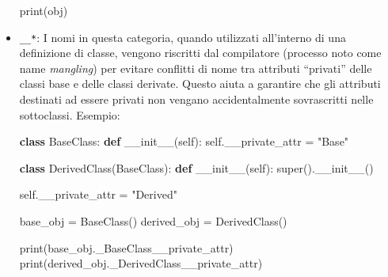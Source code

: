 \documentclass[
  letterpaper,
]{scrbook}
\newenvironment{Shaded}{\begin{snugshade}}{\end{snugshade}}
\newcommand{\BuiltInTok}[1]{\textcolor[rgb]{0.00,0.23,0.31}{#1}}
\newcommand{\FunctionTok}[1]{\textcolor[rgb]{0.28,0.35,0.67}{#1}}
\newcommand{\KeywordTok}[1]{\textcolor[rgb]{0.00,0.23,0.31}{\textbf{#1}}}
\newcommand{\NormalTok}[1]{\textcolor[rgb]{0.00,0.23,0.31}{#1}}
\newcommand{\OperatorTok}[1]{\textcolor[rgb]{0.37,0.37,0.37}{#1}}
\newcommand{\StringTok}[1]{\textcolor[rgb]{0.13,0.47,0.30}{#1}}
\newcommand{\VariableTok}[1]{\textcolor[rgb]{0.07,0.07,0.07}{#1}}
\providecommand{\tightlist}{%
  \setlength{\itemsep}{0pt}\setlength{\parskip}{0pt}}\usepackage{longtable,booktabs,array}
\newcommand*\circled[1]{\tikz[baseline=(char.base)]{
          \node[shape=circle,draw,inner sep=1pt] (char) {{\scriptsize#1}};}}
\begin{document}
\begin{itemize}
\begin{Shaded}
\begin{Highlighting}[]
\BuiltInTok{print}\NormalTok{(obj) }\hspace*{\fill}\NormalTok{\circled{3}}
\end{Highlighting}
\end{Shaded}

\item
  \texttt{\_\_*}: I nomi in questa categoria, quando utilizzati
  all'interno di una definizione di classe, vengono riscritti dal
  compilatore (processo noto come name \emph{mangling}) per evitare
  conflitti di nome tra attributi ``privati'' delle classi base e delle
  classi derivate. Questo aiuta a garantire che gli attributi destinati
  ad essere privati non vengano accidentalmente sovrascritti nelle
  sottoclassi. Esempio:

\label{annotated-cell-169}%
\begin{Shaded}
\begin{Highlighting}[]
\KeywordTok{class}\NormalTok{ BaseClass:}
  \KeywordTok{def} \FunctionTok{\_\_init\_\_}\NormalTok{(}\VariableTok{self}\NormalTok{):}
    \VariableTok{self}\NormalTok{.\_\_private\_attr }\OperatorTok{=} \StringTok{"Base"}

\KeywordTok{class}\NormalTok{ DerivedClass(BaseClass):}
  \KeywordTok{def} \FunctionTok{\_\_init\_\_}\NormalTok{(}\VariableTok{self}\NormalTok{):}
    \BuiltInTok{super}\NormalTok{().}\FunctionTok{\_\_init\_\_}\NormalTok{()}

    \VariableTok{self}\NormalTok{.\_\_private\_attr }\OperatorTok{=} \StringTok{"Derived"}

\NormalTok{base\_obj }\OperatorTok{=}\NormalTok{ BaseClass()}
\NormalTok{derived\_obj }\OperatorTok{=}\NormalTok{ DerivedClass()}

\BuiltInTok{print}\NormalTok{(base\_obj.\_BaseClass\_\_private\_attr) }\hspace*{\fill}\NormalTok{\circled{1}}
\BuiltInTok{print}\NormalTok{(derived\_obj.\_DerivedClass\_\_private\_attr) }\hspace*{\fill}\NormalTok{\circled{2}}
\end{Highlighting}
\end{Shaded}

\end{itemize}
\end{document}
